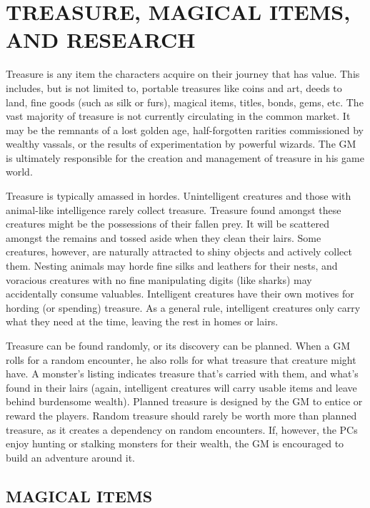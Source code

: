 \chapter{TREASURE, MAGICAL ITEMS, AND RESEARCH}

\begin{multicols}{2}

Treasure is any item the characters acquire on their journey that has value.  This includes, but is not limited to, portable treasures like coins and art, deeds to land, fine goods (such as silk or furs), magical items, titles, bonds, gems, etc.  The vast majority of treasure is not currently circulating in the common market.  It may be the remnants of a lost golden age, half-forgotten rarities commissioned by wealthy vassals, or the results of experimentation by powerful wizards.  The GM is ultimately responsible for the creation and management of treasure in his game world.

Treasure is typically amassed in hordes.  Unintelligent creatures and those with animal-like intelligence rarely collect treasure.  Treasure found amongst these creatures might be the possessions  of their fallen prey. It will be scattered amongst the remains and tossed aside when they clean their lairs.  Some creatures, however, are naturally attracted to shiny objects and actively collect them.  Nesting animals may horde fine silks and leathers for their nests, and voracious creatures with no fine manipulating digits (like sharks) may accidentally consume valuables.  Intelligent creatures have their own motives for hording (or spending) treasure.  As a general rule, intelligent creatures only carry what they need at the time, leaving the rest in homes or lairs.

Treasure can be found randomly, or its discovery can be planned.  When a GM rolls for a random encounter, he also rolls for what treasure that creature might have.  A monster's listing indicates treasure that's carried with them, and what's found in their lairs (again, intelligent creatures will carry usable items and leave behind burdensome wealth).  Planned treasure is designed by the GM to entice or reward the players.  Random treasure should rarely be worth more than planned treasure, as it creates a dependency on random encounters.  If, however, the PCs enjoy hunting or stalking monsters for their wealth, the GM is encouraged to build an adventure around it.

\section{MAGICAL ITEMS}


\end{multicols}
